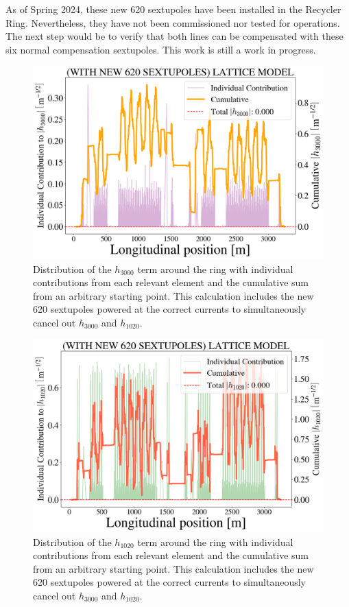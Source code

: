 As of Spring 2024, these new 620 sextupoles have been installed in the Recycler Ring. Nevertheless, they have not been commissioned nor tested for operations. The next step would be to verify that both lines can be compensated with these six normal compensation sextupoles. This work is still a work in progress.

\begin{figure}[H]
    \centering
    \includegraphics[width=\columnwidth]{chapter4/new_sexts_h3000.png}
    \caption{Distribution of the $h_{3000}$ term around the ring with individual contributions from each relevant element and the cumulative sum from an arbitrary starting point. This calculation includes the new 620 sextupoles powered at the correct currents to simultaneously cancel out $h_{3000}$ and $h_{1020}$.}
    \label{fig:h3000newsexts}
\end{figure}

\begin{figure}[H]
    \centering
    \includegraphics[width=\columnwidth]{chapter4/new_sexts_h1020.png}
    \caption{Distribution of the $h_{1020}$ term around the ring with individual contributions from each relevant element and the cumulative sum from an arbitrary starting point. This calculation includes the new 620 sextupoles powered at the correct currents to simultaneously cancel out $h_{3000}$ and $h_{1020}$.}
    \label{fig:h1020newsexts}
\end{figure}
